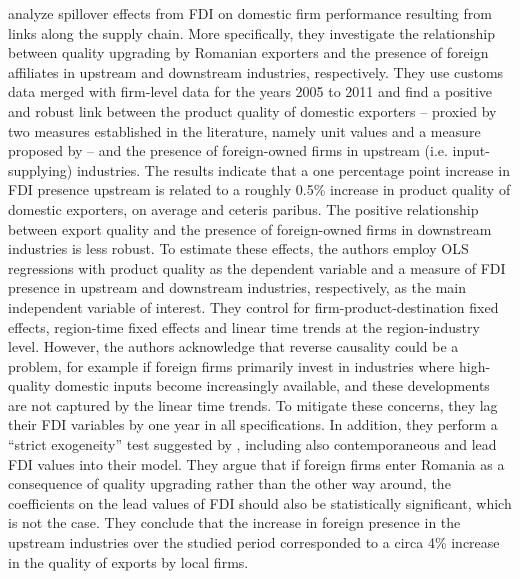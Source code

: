 \documentclass[11pt,a4paper,leqno]{article}
\begin{document}
\cite{bajgar2020climbing} analyze spillover effects from FDI on domestic firm performance resulting from links along the supply chain. More specifically, they investigate the relationship between quality upgrading by Romanian exporters and the presence of foreign affiliates in upstream and downstream industries, respectively. They use customs data merged with firm-level data for the years 2005 to 2011 and find a positive and robust link between the product quality of domestic exporters – proxied by two measures established in the literature, namely unit values and a measure proposed by \cite{khandelwal2013trade} – and the presence of foreign-owned firms in upstream (i.e. input-supplying) industries. The results indicate that a one percentage point increase in FDI presence upstream is related to a roughly 0.5\% increase in product quality of domestic exporters, on average and ceteris paribus. The positive relationship between export quality and the presence of foreign-owned firms in downstream industries is less robust. To estimate these effects, the authors employ OLS regressions with product quality as the dependent variable and a measure of FDI presence in upstream and downstream industries, respectively, as the main independent variable of interest. They control for firm-product-destination fixed effects, region-time fixed effects and linear time trends at the region-industry level. However, the authors acknowledge that reverse causality could be a problem, for example if foreign firms primarily invest in industries where high-quality domestic inputs become increasingly available, and these developments are not captured by the linear time trends. To mitigate these concerns, they lag their FDI variables by one year in all specifications. In addition, they perform a “strict exogeneity” test suggested by \cite{wooldridge2010econometric}, including also contemporaneous and lead FDI values into their model. They argue that if foreign firms enter Romania as a consequence of quality upgrading rather than the other way around, the coefficients on the lead values of FDI should also be statistically significant, which is not the case. They conclude that the increase in foreign presence in the upstream industries over the studied period corresponded to a circa 4\% increase in the quality of exports by local firms.
\end{document}
